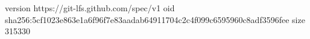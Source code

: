 version https://git-lfs.github.com/spec/v1
oid sha256:5cf1023e863e1a6f96f7e83aadab64911704c2c4f099c6595960c8adf3596fee
size 315330
